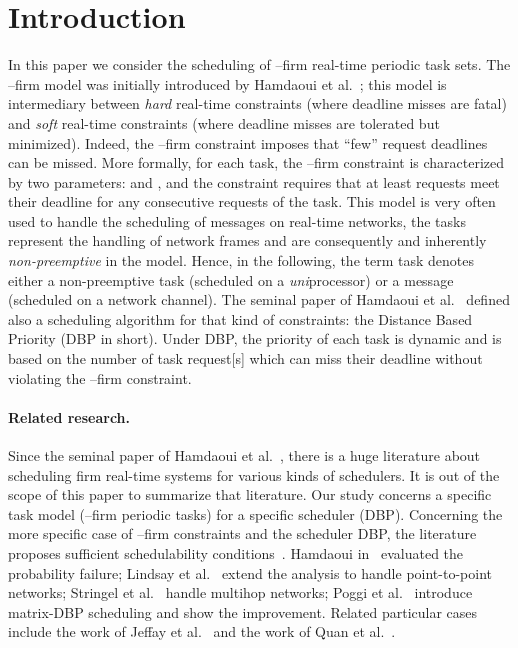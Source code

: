 \documentclass{article}
\begin{document}
\section{Introduction}\label{intro} 
In this paper we consider the scheduling of --firm real-time periodic task sets. The --firm model was initially introduced by {Hamdaoui} et al.~\cite{Hamdaoui1995}; this model is intermediary between \emph{hard} real-time constraints (where deadline misses are fatal) and \emph{soft} real-time constraints (where deadline misses are tolerated but minimized). Indeed, the --firm constraint imposes that ``few'' request deadlines can be missed. More formally, for each task, the --firm constraint is characterized by two parameters:  and , and the constraint requires that at least   requests meet their deadline for any  consecutive requests of the task. This model is very often used to handle the scheduling of messages on real-time networks, the tasks represent the handling of network frames and are consequently and inherently \emph{non-preemptive} in the model. Hence, in the following, the term task denotes either a non-preemptive task (scheduled on a \emph{uni}processor) or a message (scheduled on a network channel). The seminal paper of {Hamdaoui} et al.~\cite{Hamdaoui1995} defined also a scheduling algorithm for that kind of constraints: the Distance Based Priority (DBP in short). Under DBP, the priority of each task is dynamic and is based on the number of task request[s] which can miss their deadline without violating the --firm constraint. 

\paragraph{Related research.} 
Since the seminal paper of \mbox{Hamdaoui} et al.~\cite{Hamdaoui1995}, there is a huge literature about scheduling firm real-time systems for various kinds of schedulers. It is out of the scope of this paper to summarize that literature. Our study concerns a specific task model (--firm periodic tasks) for a specific scheduler (DBP). Concerning the more specific case of --firm constraints and the scheduler DBP, the literature proposes sufficient schedulability conditions~\cite{Li2004}. \mbox{Hamdaoui} in~\cite{Hamdaoui1997} evaluated the probability failure; \mbox{Lindsay} et al.~\cite{Lindsay1997} extend the analysis to handle point-to-point networks; \mbox{Stringel} et al.~\cite{Striegel2000} handle multihop networks; \mbox{Poggi} et al.~\cite{Poggi2003} introduce matrix-DBP scheduling and show the improvement. Related particular cases include the work of Jeffay et al.~\cite{Jeffay2005On-non-preempti} and the work of Quan et al.~\cite{Quan2000}.
\end{document}

